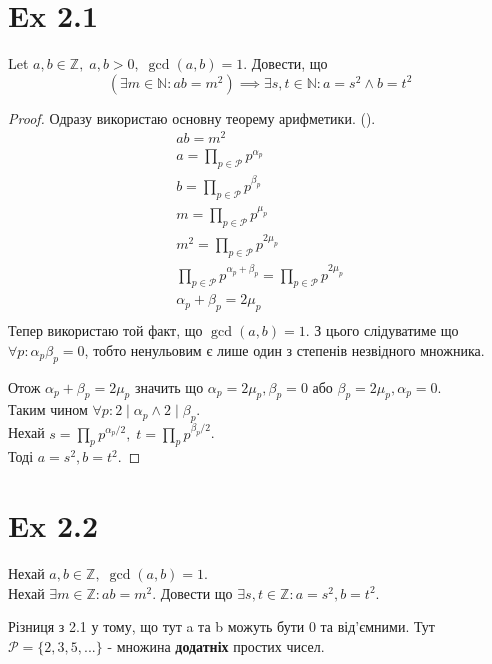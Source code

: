 \documentclass[11pt, a4paper]{article} %
\newcommand{\N}{\mathbb{N}}
\newcommand{\Z}{\mathbb{Z}}
\begin{document}
\section*{Ex 2.1}
\begin{mdframed}
    Let $a,b \in \Z,\; a,b>0, \; \gcd(a,b)=1$.
    Довести, що
    $$\left(\exists m\in\N: ab=m^2\right) \implies \exists s,t\in\N: a=s^2 \land b=t^2$$
\end{mdframed}

\begin{proof}
    Одразу використаю основну теорему арифметики. ().
    \begin{gather*}
        ab = m^2\\
        a = \prod_{p\in\mathcal{P}} p^{\alpha_p}\\
        b = \prod_{p\in\mathcal{P}} p^{\beta_p}\\
        m = \prod_{p\in\mathcal{P}} p^{\mu_p}\\
        m^2 = \prod_{p\in\mathcal{P}} p^{2\mu_p}\\
        \prod_{p\in\mathcal{P}} p^{\alpha_p+\beta_p} = \prod_{p\in\mathcal{P}} p^{2\mu_p}\\
        \alpha_p+\beta_p = 2\mu_p\\
    \end{gather*}
    Тепер використаю той факт, що $\gcd(a,b)=1$.
    З цього слідуватиме що $\forall p: \alpha_p \beta_p = 0$, тобто ненульовим є лише один з степенів незвідного множника.

    Отож $\alpha_p+\beta_p = 2\mu_p$ значить що $\alpha_p = 2\mu_p, \beta_p = 0$ або $\beta_p = 2\mu_p, \alpha_p=0$.\\
    Таким чином $\forall p: 2\mid \alpha_p \land 2\mid \beta_p$.\\
    Нехай $s = \prod_p p^{\alpha_p/2}, \; t = \prod_p p^{\beta_p/2}$.\\
    Тоді $a = s^2, b = t^2$.
\end{proof}

\section*{Ex 2.2}
\begin{mdframed}
    Нехай $a,b\in\Z, \; \gcd(a,b) = 1$.\\
    Нехай $\exists m\in\Z: ab=m^2$.
    Довести що $\exists s,t\in\Z: a=s^2, b=t^2$.
\end{mdframed}

Різниця з 2.1 у тому, що тут a та b можуть бути 0 та від'ємними.
Тут $\mathcal{P} = \{2,3,5,...\}$ - множина \textbf{додатніх} простих чисел.
\end{document}

